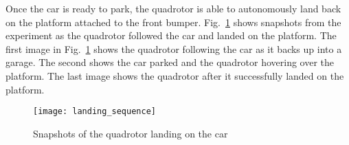 Once the car is ready to park, the quadrotor is able to autonomously land back
on the platform attached to the front bumper. Fig.~\ref{fig:landing} shows
snapshots from the experiment as the quadrotor followed the car and landed on
the platform. The first image in Fig.~\ref{fig:landing} shows the quadrotor
following the car as it backs up into a garage. The second shows the car parked
and the quadrotor hovering over the platform. The last image shows the
quadrotor after it successfully landed on the platform.

\begin{figure}[h!]

    \centering

    \centerline{\texttt{[image: landing\_sequence]}}

    \caption{Snapshots of the quadrotor landing on the car}

    \label{fig:landing}

\end{figure}
